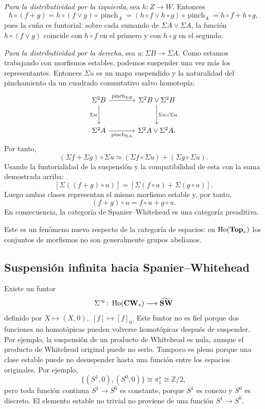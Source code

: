 \begin{sol}
\emph{Para la distributividad por la izquierda}, sea $h\colon Z\to W$. Entonces
\[
h\circ(f+g)=h\circ(f\vee g)\circ\operatorname{pinch}_A=(h\circ f\vee h\circ g)\circ\operatorname{pinch}_A=h\circ f+h\circ g,
\]
pues la cuña es funtorial: sobre cada sumando de $\Sigma A\vee\Sigma A$, la función $h\circ(f\vee g)$ coincide con $h\circ f$ en el primero y con $h\circ g$ en el segundo.

\emph{Para la distributividad por la derecha}, sea $u\colon\Sigma B\to\Sigma A$. Como estamos trabajando con morfismos estables, podemos suspender una vez más los representantes. Entonces $\Sigma u$ es un mapa suspendido y la naturalidad del pinchamiento da un cuadrado conmutativo salvo homotopía:
\[
\begin{tikzcd}[column sep=large, row sep=large]
\Sigma^2 B \arrow[r,"{\operatorname{pinch}_{\Sigma B}}"] \arrow[d,"\Sigma u"'] &
\Sigma^2B\vee\Sigma^2B \arrow[d,"\Sigma u\vee\Sigma u"]\\
\Sigma^2 A \arrow[r,"{\operatorname{pinch}_{\Sigma A}}"'] &
\Sigma^2A\vee\Sigma^2A.
\end{tikzcd}
\]
Por tanto,
\[
(\Sigma f+\Sigma g)\circ\Sigma u
\simeq
(\Sigma f\circ\Sigma u)+(\Sigma g\circ\Sigma u).
\]
Usando la funtorialidad de la suspensión y la compatibilidad de esta con la suma demostrada arriba:
\[
[\Sigma((f+g)\circ u)]
=
[\Sigma(f\circ u)+\Sigma(g\circ u)].
\]
Luego ambas clases representan el mismo morfismo estable y, por tanto,
\[
(f+g)\circ u=f\circ u+g\circ u.
\]
En consecuencia, la categoría de Spanier--Whitehead es una categoría preaditiva.
\end{sol}

Este es un fenómeno nuevo respecto de la categoría de espacios: en \(\operatorname{Ho}(\mathbf{Top}_*)\) los conjuntos de morfismos no son generalmente grupos abelianos.

\subsection{Suspensión infinita hacia Spanier--Whitehead}

Existe un funtor
\[
\Sigma^\infty\colon\operatorname{Ho}(\mathbf{CW}_*)\longrightarrow\widetilde{\mathbf{SW}}
\]
definido por $X\longmapsto(X,0),\;[f]\longmapsto[f]_0$.
Este funtor no es fiel porque dos funciones no homotópicas pueden volverse homotópicas después de suspender. Por ejemplo, la suspensión de un producto de Whitehead es nula, aunque el producto de Whitehead original puede no serlo.
Tampoco es pleno porque una clase estable puede no desuspender hasta una función entre los espacios originales. Por ejemplo,
\[
\{(S^1,0),(S^0,0)\}\cong\pi_1^s\cong\mathbb Z/2,
\]
pero toda función continua \(S^1\to S^0\) es constante, porque \(S^1\) es conexo y \(S^0\) es discreto. El elemento estable no trivial no proviene de una función \(S^1\to S^0\).

